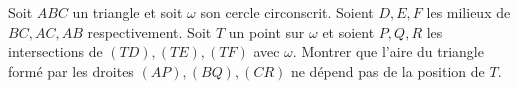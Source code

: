 Soit $ABC$ un triangle et soit $\omega$ son cercle circonscrit. Soient $D, E, F$ les milieux de $BC, AC, AB$ respectivement. Soit $T$ un point sur $\omega$ et soient $P, Q, R$ les intersections de $(TD), (TE), (TF)$ avec $\omega$. Montrer que l'aire du triangle formé par les droites $(AP), (BQ), (CR)$ ne dépend pas de la position de $T$.